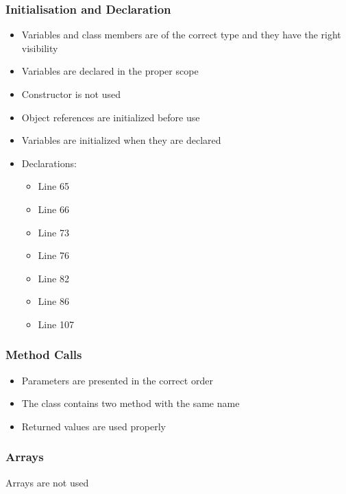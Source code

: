 \subsubsection{Initialisation and Declaration}
\begin{itemize}
\item Variables and class members are of the correct type and they have the right visibility
\item Variables are declared in the proper scope
\item Constructor is not used
\item Object references are initialized before use
\item Variables are initialized when they are declared
\item Declarations:
\begin{itemize}
\item Line 65
\item Line 66
\item Line 73
\item Line 76
\item Line 82
\item Line 86
\item Line 107
\end{itemize}
\end{itemize}


\subsubsection{Method Calls}
\begin{itemize}
\item Parameters are presented in the correct order
\item The class contains two method with the same name
\item Returned values are used properly
\end{itemize}


\subsubsection{Arrays}
Arrays are not used




